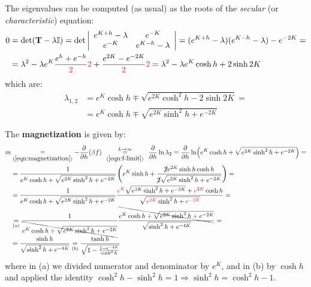 \documentclass[../template.tex]{subfiles}
\begin{document}
The eigenvalues can be computed (as usual) as the roots of the \textit{secular} (or \textit{characteristic}) equation:
\begin{align*}
    0 &= \operatorname{det}(\textbf{T} - \lambda \bb{I}) = \operatorname{det} \left|\begin{array}{cc}
    e^{K+h}-\lambda & e^{-K} \\ 
    e^{-K} & e^{K-h}-\lambda
    \end{array}\right| = (e^{K+h} -\lambda)(e^{K-h}-\lambda) - e^{-2K} =\\
    &= \lambda^2 -\lambda e^{K} \frac{e^h + e^{-h}}{\textcolor{Red}{2}}\textcolor{Red}{2} + \frac{e^{2K} - e^{-2K}}{\textcolor{Red}{2}}\textcolor{Red}{2} = \lambda^2 - \lambda e^K \cosh h + 2 \sinh 2K 
\end{align*} 
which are:
\begin{align*}
    \lambda_{1,2} &= e^K \cosh h \mp \sqrt{e^{2K} \cosh^2 h - 2 \sinh 2K} =\\
    &= e^K \cosh h \mp \sqrt{e^{2K} \sinh^2 h + e^{-2K}}
\end{align*}

The \textbf{magnetization} is given by:
\begin{align}\nonumber
    m &\underset{(\ref{eqn:magnetization})}{=}  -\pdv{h} (\beta f) \>\>\overset{\mathclap{L \to \infty}}{\underset{(\ref{eqn:f-limit})}{=}} \>\> \pdv{h} \ln \lambda_2 = \pdv{h} \ln (e^{K} \cosh h + \sqrt{e^{2K} \sinh^2 h + e^{-2K}}) =\\ \nonumber
    &= \frac{1}{e^{K} \cosh h + \sqrt{e^{2K} \sinh^2 h + e^{-2K}}} \left(e^{K} \sinh h + \frac{\cancel{2} e^{2K} \sinh h \cosh h}{\cancel{2} \sqrt{e^{2K} \sinh^2 h + e^{-2K}}} \right) =\\ \nonumber
    &= \frac{1}{e^{K} \cosh h + \sqrt{e^{2K} \sinh^2 h + e^{-2K}}} \frac{\textcolor{Red}{e^K} \sqrt{e^{2K} \sinh^2 h + e^{-2K}} + \textcolor{Red}{e}^{2\textcolor{Red}{K}} \cosh h}{\sqrt{\textcolor{Red}{e^{2K}} \sinh^2 h + \textcolor{Red}{e^{-2K}}}} =\\ \nonumber
    &\underset{(a)}{=}  \frac{1}{\bcancel{e^{K} \cosh h + \sqrt{e^{2K} \sinh^2 h + e^{-2K}}}} \frac{\bcancel{e^K \cosh h + \sqrt{e^{2K} \sinh^2 h + e^{-2K}}}}{\sqrt{\sinh^2 h + e^{-4K}}} =\\
    &=  \frac{\sinh h}{\sqrt{\sinh^2 h + e^{-4K}}} \underset{(b)}{=} \frac{\tanh h}{\sqrt{1 - \frac{1-e^{-4K}}{\cosh^2 h} }} \label{eqn:m-pbc}
\end{align}
where in (a) we divided numerator and denominator by $e^K$, and in (b) by $\cosh h$ and applied the identity $\cosh^2 h - \sinh^2 h = 1 \Rightarrow \sinh^2 h = \cosh^2 h - 1$. 
\end{document}
